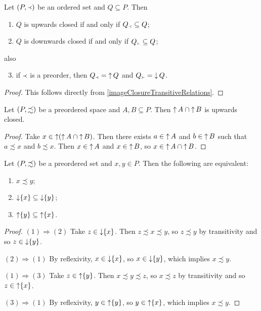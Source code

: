 \begin{lemma} \label{upwardDownwardClosure}
Let $\sSet{P, \Yleft}$ be an ordered set and $Q\subseteq P$. Then
\begin{enumerate}
\item $Q$ is upwards closed \textup{if and only if} $Q_\Yleft \subseteq Q$;
\item $Q$ is downwards closed \textup{if and only if} $Q_{\Yright} \subseteq Q$;
\end{enumerate}
also
\begin{enumerate} \setcounter{enumi}{2}
\item if $\Yleft$ is a preorder, then $Q_\Yleft = \operatorname{\uparrow} Q$ and $Q_{\Yright} = \operatorname{\downarrow} Q$.
\end{enumerate}
\end{lemma}
\begin{proof}
This follows directly from \ref{imageClosureTransitiveRelations}.
\end{proof}


\begin{lemma} \label{intersectionUpwardsClosedIsUpwardsClosed}
Let $\sSet{P, \precsim}$ be a preordered space and $A,B\subseteq P$. Then $\operatorname{\uparrow} A \cap \operatorname{\uparrow} B$ is upwards closed.
\end{lemma}
\begin{proof}
Take $x\in \operatorname{\uparrow}(\operatorname{\uparrow} A \cap \operatorname{\uparrow} B)$. Then there exists $a\in \operatorname{\uparrow} A$ and $b\in \operatorname{\uparrow} B$ such that $a\precsim x$ and $b\precsim x$. Then $x\in \operatorname{\uparrow} A$ and $x\in \operatorname{\uparrow} B$, so $x\in \operatorname{\uparrow} A \cap \operatorname{\uparrow} B$.
\end{proof}

\begin{lemma} \label{principalDownSetEmbedding}
Let $\sSet{P,\precsim}$ be a preordered set and $x,y\in P$. Then the following are equivalent:
\begin{enumerate}
\item $x \precsim y$;
\item $\operatorname{\downarrow} \{x\} \subseteq \operatorname{\downarrow} \{y\}$;
\item $\operatorname{\uparrow} \{y\} \subseteq \operatorname{\uparrow} \{x\}$.
\end{enumerate}
\end{lemma}
\begin{proof}
$(1) \Rightarrow (2)$ Take $z\in \operatorname{\downarrow}\{x\}$. Then $z \precsim x\precsim y$, so $z\precsim y$ by transitivity and so $z\in \operatorname{\downarrow}\{y\}$.

$(2) \Rightarrow (1)$ By reflexivity, $x\in \operatorname{\downarrow}\{x\}$, so $x\in \operatorname{\downarrow}\{y\}$, which implies $x\precsim y$.

$(1) \Rightarrow (3)$ Take $z\in \operatorname{\uparrow}\{y\}$. Then $x\precsim y \precsim z$, so $x\precsim z$ by transitivity and so $z\in \operatorname{\uparrow}\{x\}$.

$(3) \Rightarrow (1)$ By reflexivity, $y\in \operatorname{\uparrow}\{y\}$, so $y\in \operatorname{\uparrow}\{x\}$, which implies $x\precsim y$.
\end{proof}

